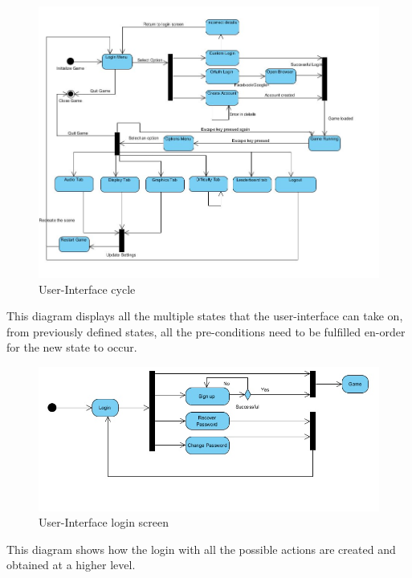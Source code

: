 \documentclass[letterpaper]{article}
\begin{document}
					\begin{figure}[H]
					\centering
					\includegraphics[width=180mm]{UML_Diagram/State/GUI_State.jpg}
					\caption{User-Interface cycle}
					\label{overflow}
					\end{figure}
					This diagram displays all the multiple states that the user-interface can take on, from previously defined states, all the pre-conditions need to be fulfilled en-order for the new state to occur.
					
					\begin{figure}[H]
					\centering
					\includegraphics[width=180mm]{UML_Diagram/Activity/login.jpg}
					\caption{User-Interface login screen}
					\label{overflow}
					\end{figure}
					This diagram shows how the login with all the possible actions are created and obtained at a higher level.
					
\end{document}
